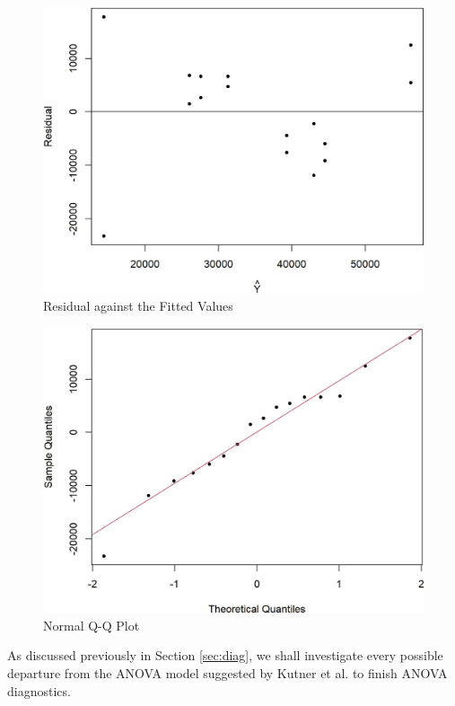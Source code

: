\documentclass[11pt]{article}
\begin{document}
\begin{figure}[h!]
\centering
\includegraphics[scale = 0.6]{residual}
\caption{Residual against the Fitted Values}\label{fig:residual}
\end{figure}

\begin{figure}[h!]
\centering
\includegraphics[scale = 0.6]{qq}
\caption{Normal Q-Q Plot}\label{fig:qq}
\end{figure}

As discussed previously in Section \ref{sec:diag}, we shall investigate every possible departure from the ANOVA model suggested by Kutner et al. \cite{bk:dae1} to finish ANOVA diagnostics.
\end{document}
